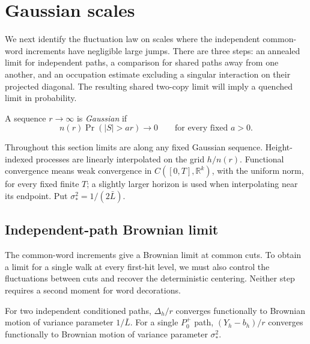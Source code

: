 \section{Gaussian scales}\label{sec:gaussian}

We next identify the fluctuation law on scales where the independent
common-word increments have negligible large jumps. There are three
steps: an annealed limit for independent paths, a comparison for shared
paths away from one another, and an occupation estimate excluding a
singular interaction on their projected diagonal. The resulting shared
two-copy limit will imply a quenched limit in probability.

\begin{definition}\label{gauss-sequence}
A sequence \(r\to\infty\) is \emph{Gaussian} if
\[
n(r)\Pr(|S|>a r)\longrightarrow0\qquad\text{for every fixed }a>0.
\tag{14}\label{eq:14}
\]
\end{definition}

Throughout this section limits are along any fixed Gaussian sequence.
Height-indexed processes are linearly interpolated on the grid
\(h/n(r)\). Functional convergence means weak convergence in
\(C([0,T],\mathbb R^k)\), with the uniform norm, for every fixed finite
\(T\); a slightly larger horizon is used when interpolating near its
endpoint. Put \(\sigma_*^2=1/(2\bar L)\).

\subsection{Independent-path Brownian limit}

The common-word increments give a Brownian limit at common cuts. To
obtain a limit for a single walk at every first-hit level, we must also
control the fluctuations between cuts and recover the deterministic
centering. Neither step requires a second moment for word decorations.

\begin{lemma}\label{gauss-independent}
For two independent conditioned paths, \(\Delta_h/r\) converges
functionally to Brownian motion of variance parameter \(1/\bar L\).
For a single \(P_0^+\) path, \((Y_h-b_h)/r\) converges functionally to
Brownian motion of variance parameter \(\sigma_*^2\).
\end{lemma}

